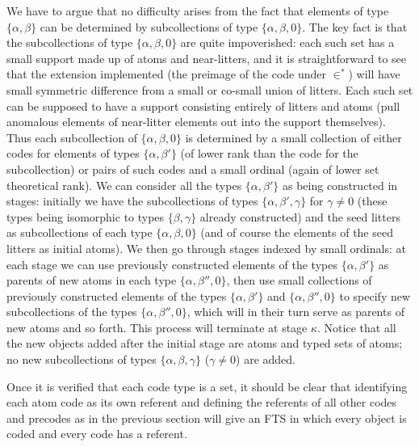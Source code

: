 \documentclass{article}
\begin{document}
\begin{description}
We have to argue that no difficulty arises from the fact that elements of type $\{\alpha,\beta\}$ can be determined by subcollections of type $\{\alpha,\beta,0\}$.  The key fact is that the subcollections of type $\{\alpha,\beta,0\}$ are quite impoverished:  each such set has a small support made up of atoms and near-litters, and it is straightforward to see that the extension implemented (the preimage of the code under $\in^*$) will have small symmetric difference from a small or co-small union of litters.  Each such set can be supposed to have a support consisting entirely of litters and atoms (pull anomalous elements of near-litter elements out into the support themselves).  Thus each subcollection of $\{\alpha,\beta,0\}$ is determined by a small collection of either codes for elements of types $\{\alpha,\beta'\}$ (of lower rank than the code for the subcollection) or pairs of such codes and a small ordinal
(again of lower set theoretical rank).  We can consider all the types $\{\alpha,\beta'\}$ as being constructed in stages:  initially we have the subcollections of types $\{\alpha,\beta',\gamma\}$ for $\gamma \neq 0$ (these types being isomorphic to types $\{\beta,\gamma\}$ already constructed) and the seed litters as subcollections of each type $\{\alpha,\beta,0\}$ (and of course the elements of the seed litters as initial atoms).   We then go through stages indexed by small ordinals:  at each stage we can use previously constructed elements of the types $\{\alpha,\beta'\}$ as parents of new atoms in each type $\{\alpha,\beta'',0\}$, then use small collections of previously constructed elements of the types $\{\alpha,\beta'\}$
and $\{\alpha,\beta'',0\}$
to specify new subcollections of the types $\{\alpha,\beta'',0\}$, which will in their turn serve as parents of new atoms and so forth.   This process will terminate at stage $\kappa$.  Notice that all the new objects added after the initial stage are atoms and typed sets of atoms; no new subcollections of types $\{\alpha,\beta,\gamma\}$ ($\gamma \neq 0$) are added.  

Once it is verified that each code type is a set, it should be clear that identifying each atom code as its own referent and defining the referents of all other codes and precodes
as in the previous section will give an FTS in which every object is coded and every code has a referent.


\end{description}
\end{document}
